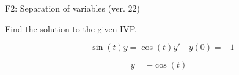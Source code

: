 \begin{exercise}
  \begin{exerciseTitle}F2: Separation of variables (ver. 22)\end{exerciseTitle}
  \begin{exerciseStatement}
    
Find the solution to the given IVP.

    
\[-\sin\left(t\right) y= \cos\left(t\right) y'\hspace{1em} y\left( 0 \right)= -1\]

  \end{exerciseStatement}
  \begin{exerciseAnswer}
    
\[y= -\cos\left(t\right)\]

  \end{exerciseAnswer}
\end{exercise}